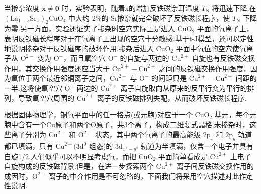 当掺杂浓度 $\boldsymbol{x}\neq\boldsymbol{0}$ 时，实验表明，随着x的增加反铁磁奈耳温度 $T_{\mathrm{N}}$ 将迅速下降.\allowbreak 在 $(\mathrm{La}_{1-x}\mathrm{Sr}_{x})_{2}\allowbreak\mathrm{CuO_{4}}$ 中大约 2\%的 Sr掺杂就完全破坏了反铁磁长程序，使 $T_{\mathrm{N}}$ 下降为零.另一方面，实验还证实了掺杂时空穴实际上是进入 $\mathrm{CuO_{2}}$ 平面的氧离子上，表明反铁磁长程序对于在氧离子上出现的空穴十分敏感.基于t-J模型，还可以定性地说明掺杂对于反铁磁序的破坏作用.掺杂后进入 $\mathrm{CuO_{2}}$ 平面中氧位的空穴使氧离子从 $\mathrm{O}^{2-}$ 变为 $\mathrm{O}^{-}$，而且氧空穴 $\mathrm{O}^{-}$ 的自旋与两边的 $\mathrm{Cu}^{2+}$ 自旋也有反铁磁交换作用，其交换作用强度还应当大于 $\mathrm{Cu}^{2+}-\mathrm{Cu}^{2+}$ 之间的反铁磁交换作用强度，因为氧位于两个最近邻铜离子之间，$\mathrm{Cu}^{2+}$ 与 $\mathrm{O}^{-}$ 的间距只是 $\mathrm{Cu}^{2+}-\mathrm{Cu}^{2+}$ 间距的一半.这将使氧空穴 $\mathrm{O}^{-}$ 两边的 $\mathrm{Cu}^{2+}$ 离子自旋取向从原来的反平行变为平行的排列，导致氧空穴周围的 $\mathrm{Cu}^{2+}$ 离子的反铁磁排列失配，从而破坏反铁磁长程序.

根据固体物理学，铜氧平面中的任一格点(或元胞)对应于一个 $\mathrm{CuO_{2}}$ 基元，每个元胞中含有一个Cu原子和两个O原子，共3个离子，构成二维复式晶格.未掺杂时，这些离子分别为 $\mathrm{Cu}^{2+}$ 和 $\mathrm{O}^{2-}$ 状态，其中两个氧离子的最高能级 $2\mathrm{p}_{x}$ 和 $2\mathrm{p}_{y}$ 轨道都已填满，只有 $\mathrm{Cu}^{2+}(3\mathrm{d}^{9}$ 组态)的 $3\mathrm{d}_{x^{2}-y^{2}}$ 轨道为半填满，仅含一个电子并具有自旋1/2.人们似乎可以不明显考虑氧，而把 $\mathrm{CuO_{2}}$ 平面简单看成是 $\mathrm{Cu}^{2+}$ 上电子自旋构成的反铁磁背景.但是，在进一步探索两个 $\mathrm{Cu}^{2+}$ 离子间反铁磁交换作用的成因时，$\mathrm{O}^{2-}$ 离子的中介作用是不可忽略的，下面我们将采用空穴描述对此作定性说明.


